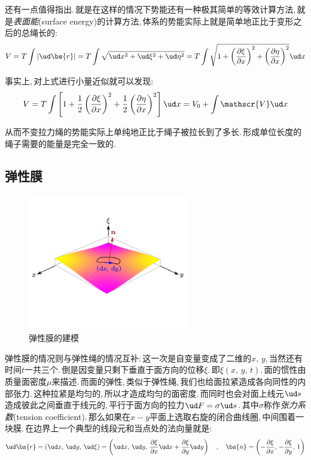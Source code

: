 还有一点值得指出.\,就是在这样的情况下势能还有一种极其简单的等效计算方法,\,就是\emph{表面能}(surface energy)的计算方法,\,体系的势能实际上就是简单地正比于变形之后的总绳长的:
\[V=T\int |\ud \bs{r}|=T\int \sqrt{\ud x^2+\ud \xi^2+\ud \eta^2}=T\int \sqrt{1+\left(\frac{\partial \xi}{\partial x}\right)^2+\left(\frac{\partial \eta}{\partial x}\right)^2}\ud x\]

事实上,\,对上式进行小量近似就可以发现:
\[V=T\int \left[1+\frac{1}{2}\left(\frac{\partial \xi}{\partial x}\right)^2+\frac{1}{2}\left(\frac{\partial \eta}{\partial x}\right)^2\right]\ud x=V_0+\int \mathscr{V}\ud x\]

从而不变拉力绳的势能实际上单纯地正比于绳子被拉长到了多长.\,形成单位长度的绳子需要的能量是完全一致的.

\subsection{弹性膜}

\begin{figure}
\vspace{-0.5cm}
\centering
\includegraphics[width=7cm]{image/6-7-6.png}

\vspace{-1.2cm}
\caption{弹性膜的建模}\label{6-7-4}
\end{figure}

弹性膜的情况则与弹性绳的情况互补:\,这一次是自变量变成了二维的$x,\,y$,\,当然还有时间$t$一共三个.\,倒是因变量只剩下垂直于面方向的位移$\xi$.\,即$\xi(x,\,y,\,t)$.\,面的惯性由质量面密度$\mu$来描述.\,而面的弹性,\,类似于弹性绳,\,我们也给面拉紧造成各向同性的内部张力.\,这种拉紧是均匀的,\,所以才造成均匀的面密度.\,而同时也会对面上线元$\ud s$造成彼此之间垂直于线元的,\,平行于面方向的拉力$\ud F=\sigma \ud s$.\,其中$\sigma$称作\emph{张力系数}(tension coefficient).\,那么如果在$x-y$平面上选取右旋的闭合曲线圈,\,中间围着一块膜.\,在边界上一个典型的线段元和当点处的法向量就是:
\[\ud \bs{r}=(\ud x,\,\ud y,\,\ud \xi)=\left(\ud x,\,\ud y,\,\frac{\partial \xi}{\partial x}\ud x+\frac{\partial \xi}{\partial y}\ud y\right)\quad ,\quad \bs{n}=\left(-\frac{\partial \xi}{\partial x},\,-\frac{\partial \xi}{\partial y},\,1\right)\]

